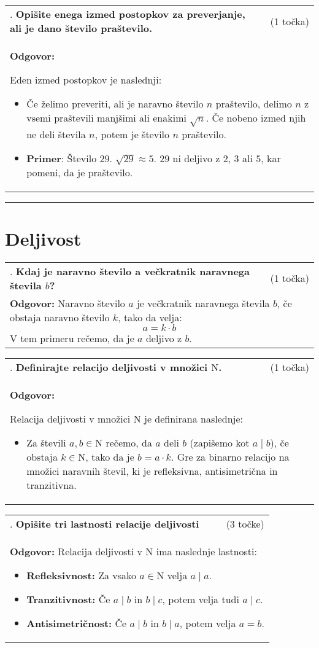 \documentclass[12pt]{article}
\newcounter{vprasanje}[section]
\renewcommand{\thevprasanje}{\roman{vprasanje}}
\newcommand{\vprasanje}[2]{%
  \stepcounter{vprasanje}%
  \textbf{\thevprasanje}. \textbf{#1} & (#2) \\
}
\newcommand{\odgovor}[1]{%
  \multicolumn{2}{p{\dimexpr\textwidth-2\tabcolsep\relax}}{%
    \small \textbf{Odgovor:} #1%
  } \\[1em]%
}
\newcommand{\crta}{\rule{\textwidth}{0.4pt}}
\newcommand{\naslov}[1]{%
  \vspace{1em} 
  \section{#1}
  \addcontentsline{toc}{section}{\protect\numberline{}#1}%
}
\newcommand{\razmak}[1]{%
  \vspace{#1}
}
\begin{document}
\begin{tabularx}{\textwidth}{X r}
\vprasanje{Opišite enega izmed postopkov za preverjanje, ali je dano število praštevilo.}{1 točka}
\odgovor{%

Eden izmed postopkov je naslednji:
	\begin{itemize}
		\item Če želimo preveriti, ali je naravno število $n$ praštevilo, delimo $n$ z vsemi praštevili manjšimi ali enakimi $\sqrt{n}$. Če nobeno izmed njih ne deli števila $n$, potem je število $n$ praštevilo.
		\item \textbf{Primer}: Število $29$. ${\sqrt{29} \approx 5}$. $29$ ni deljivo z $2$, $3$ ali $5$, kar pomeni, da je praštevilo.
	\end{itemize}
}
\end{tabularx}

\razmak{0.5em}


\crta

\naslov{Deljivost}

\begin{tabularx}{\textwidth}{X r}
\vprasanje{Kdaj je naravno število a večkratnik naravnega števila $b$?}{1 točka}
\odgovor{%
Naravno število $a$ je večkratnik naravnega števila $b$, če obstaja naravno število $k$, tako da velja:
$$a = k \cdot b$$
V tem primeru rečemo, da je $a$ deljivo z $b$.
}
\end{tabularx}

\razmak{1em}

\begin{tabularx}{\textwidth}{X r}
\vprasanje{Definirajte relacijo deljivosti v množici $\mathrm{N}$.}{1 točka}
\odgovor{%

Relacija deljivosti v množici $\mathrm{N}$ je definirana naslednje:
\begin{itemize}
	\item Za števili $a, b \in \mathrm{N}$ rečemo, da $a$ deli $b$ (zapišemo kot $a \mid b$), če obstaja $k \in \mathrm{N}$, tako da je $b = a \cdot k$. Gre za binarno relacijo na množici naravnih števil, ki je refleksivna, antisimetrična in tranzitivna.
\end{itemize}
}
\end{tabularx}

\begin{tabularx}{\textwidth}{X r}
\vprasanje{Opišite tri lastnosti relacije deljivosti}{3 točke}
\odgovor{%
Relacija deljivosti v $\mathrm{N}$ ima naslednje lastnosti:
\begin{itemize}
  \item \textbf{Refleksivnost:} Za vsako $a \in \mathrm{N}$ velja $a \mid a$.
  \item \textbf{Tranzitivnost:} Če $a \mid b$ in $b \mid c$, potem velja tudi $a \mid c$.
  \item \textbf{Antisimetričnost:} Če $a \mid b$ in $b \mid a$, potem velja $a = b$.
\end{itemize}
}
\end{tabularx}
\end{document}
